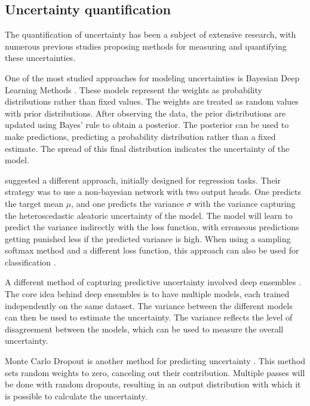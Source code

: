 \subsection{Uncertainty quantification}

The quantification of uncertainty has been a subject of extensive research, with numerous previous studies proposing methods for measuring and quantifying these uncertainties.

One of the most studied approaches for modeling uncertainties is Bayesian Deep Learning Methods \citep{kendall2017uncertainties, chen2020uncertainty}. These models represent the weights as probability distributions rather than fixed values. The weights are treated as random values with prior distributions. After observing the data, the prior distributions are updated using Bayes' rule to obtain a posterior. The posterior can be used to make predictions, predicting a probability distribution rather than a fixed estimate. The spread of this final distribution indicates the uncertainty of the model.

\cite{nix1994estimating} suggested a different approach, initially designed for regression tasks. Their strategy was to use a non-bayesian network with two output heads. One predicts the target mean $\mu$, and one predicts the variance $\sigma$ with the variance capturing the heteroscedastic aleatoric uncertainty of the model. The model will learn to predict the variance indirectly with the loss function, with erroneous predictions getting punished less if the predicted variance is high. When using a sampling softmax method and a different loss function, this approach can also be used for classification \citep{kendall2017uncertainties}.

A different method of capturing predictive uncertainty involved deep ensembles \citep{lakshminarayanan2017simple}. The core idea behind deep ensembles is to have multiple models, each trained independently on the same dataset. The variance between the different models can then be used to estimate the uncertainty. The variance reflects the level of disagreement between the models, which can be used to measure the overall uncertainty.

Monte Carlo Dropout is another method for predicting uncertainty \citep{gal2016dropout}. This method sets random weights to zero, canceling out their contribution. Multiple passes will be done with random dropouts, resulting in an output distribution with which it is possible to calculate the uncertainty.

